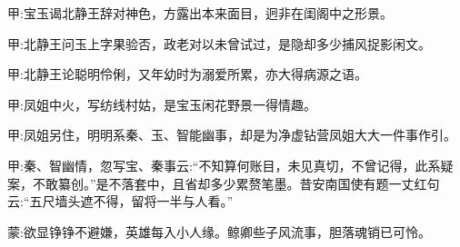 

\begin{parag}
    \begin{note}甲:宝玉谒北静王辞对神色，方露出本来面目，迥非在闺阁中之形景。\end{note}
\end{parag}


\begin{parag}
    \begin{note}甲:北静王问玉上字果验否，政老对以未曾试过，是隐却多少捕风捉影闲文。\end{note}
\end{parag}


\begin{parag}
    \begin{note}甲:北静王论聪明伶俐，又年幼时为溺爱所累，亦大得病源之语。\end{note}
\end{parag}


\begin{parag}
    \begin{note}甲:凤姐中火，写纺线村姑，是宝玉闲花野景一得情趣。\end{note}
\end{parag}


\begin{parag}
    \begin{note}甲:凤姐另住，明明系秦、玉、智能幽事，却是为净虚钻营凤姐大大一件事作引。\end{note}
\end{parag}


\begin{parag}
    \begin{note}甲:秦、智幽情，忽写宝、秦事云:“不知算何账目，未见真切，不曾记得，此系疑案，不敢纂创。”是不落套中，且省却多少累赘笔墨。昔安南国使有题一丈红句云:“五尺墙头遮不得，留将一半与人看。”\end{note}
\end{parag}


\begin{parag}
    \begin{note}蒙:欲显铮铮不避嫌，英雄每入小人缘。鲸卿些子风流事，胆落魂销已可怜。\end{note}
\end{parag}


